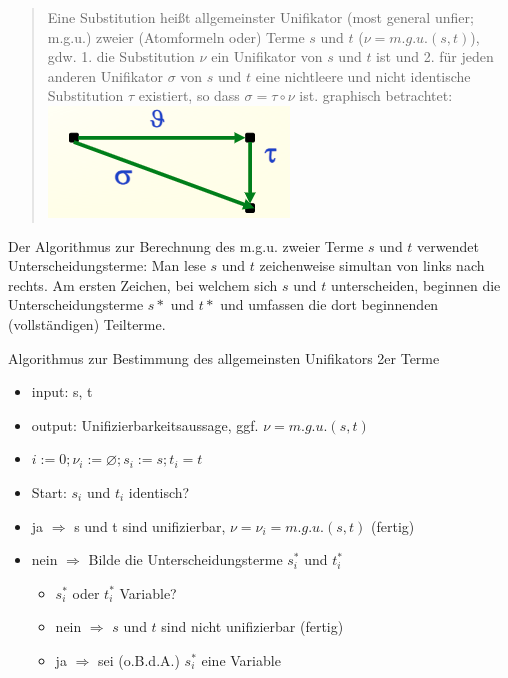 \documentclass[a4paper]{article}
\begin{document}
\begin{multicols}{3}
\begin{quote}
    Eine Substitution heißt allgemeinster Unifikator (most general unfier;
    m.g.u.) zweier (Atomformeln oder) Terme $s$ und $t$
    ($\nu= m.g.u.(s,t)$), gdw. 1. die Substitution $\nu$ ein Unifikator von
    $s$ und $t$ ist und 2. für jeden anderen Unifikator $\sigma$ von $s$ und
    $t$ eine nichtleere und nicht identische Substitution $\tau$ existiert,
    so dass $\sigma=\tau\circ\nu$ ist. graphisch betrachtet:
    \includegraphics[width=\linewidth]{Assets/Logik_allgemeinster-unifikator.png}
  \end{quote}

  Der Algorithmus zur Berechnung des m.g.u. zweier Terme $s$ und $t$
  verwendet Unterscheidungsterme: Man lese $s$ und $t$ zeichenweise
  simultan von links nach rechts. Am ersten Zeichen, bei welchem sich $s$
  und $t$ unterscheiden, beginnen die Unterscheidungsterme $s*$ und $t*$
  und umfassen die dort beginnenden (vollständigen) Teilterme.

  Algorithmus zur Bestimmung des allgemeinsten Unifikators 2er Terme

  \begin{itemize}
    \itemsep1pt\parskip0pt
    \item
          input: s, t
    \item
          output: Unifizierbarkeitsaussage, ggf. $\nu= m.g.u.( s , t )$
    \item
          $i:=0;\nu_i:=\varnothing;s_i:=s; t_i=t$
    \item
          Start: $s_i$ und $t_i$ identisch?
    \item
          ja $\Rightarrow$ s und t sind unifizierbar, $\nu=\nu_i=m.g.u.(s,t)$
          (fertig)
    \item
          nein $\Rightarrow$ Bilde die Unterscheidungsterme $s_i^*$ und $t_i^*$

          \begin{itemize}
            \item
                  $s_i^*$ oder $t_i^*$ Variable?
            \item
                  nein $\Rightarrow$ $s$ und $t$ sind nicht unifizierbar (fertig)
            \item
                  ja $\Rightarrow$ sei (o.B.d.A.) $s_i^*$ eine Variable


\end{itemize}
\end{itemize}
\end{multicols}
\end{document}
